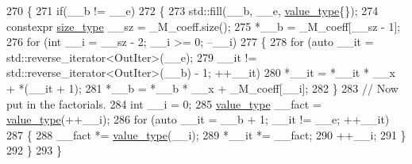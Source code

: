 \begin{DoxyCode}
270         \{
271           \textcolor{keywordflow}{if}(\_\_b != \_\_e)
272             \{
273               std::fill(\_\_b, \_\_e, \hyperlink{class____gnu__cxx_1_1__StaticPolynomial_af23110f5a002cd6caa3542df7cf35284}{value\_type}\{\});
274               constexpr \hyperlink{class____gnu__cxx_1_1__StaticPolynomial_a3384ce6a956ad398fc995e6ee53b2b18}{size\_type} \_\_sz = \_M\_coeff.size();
275               *\_\_b = \_M\_coeff[\_\_sz - 1];
276               \textcolor{keywordflow}{for} (\textcolor{keywordtype}{int} \_\_i = \_\_sz - 2; \_\_i >= 0; --\_\_i)
277                 \{
278                   \textcolor{keywordflow}{for} (\textcolor{keyword}{auto} \_\_it = std::reverse\_iterator<OutIter>(\_\_e);
279                            \_\_it != std::reverse\_iterator<OutIter>(\_\_b) - 1; ++\_\_it)
280                     *\_\_it = *\_\_it * \_\_x + *(\_\_it + 1);
281                   *\_\_b = *\_\_b * \_\_x + \_M\_coeff[\_\_i];
282                 \}
283               \textcolor{comment}{//  Now put in the factorials.}
284               \textcolor{keywordtype}{int} \_\_i = 0;
285               \hyperlink{class____gnu__cxx_1_1__StaticPolynomial_af23110f5a002cd6caa3542df7cf35284}{value\_type} \_\_fact = \hyperlink{class____gnu__cxx_1_1__StaticPolynomial_af23110f5a002cd6caa3542df7cf35284}{value\_type}(++\_\_i);
286               \textcolor{keywordflow}{for} (\textcolor{keyword}{auto} \_\_it = \_\_b + 1; \_\_it != \_\_e; ++\_\_it)
287                 \{
288                   \_\_fact *= \hyperlink{class____gnu__cxx_1_1__StaticPolynomial_af23110f5a002cd6caa3542df7cf35284}{value\_type}(\_\_i);
289                   *\_\_it *= \_\_fact;
290                   ++\_\_i;
291                 \}
292             \}
293         \}
\end{DoxyCode}
\mbox{\label{class____gnu__cxx_1_1__StaticPolynomial_aa52266d4ffacd2427da8c94540109ec1}} 
